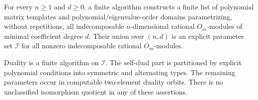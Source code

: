 \begin{theorem}
\label{C:Om-canonical-templates}
For every $n\geq1$ and $d\geq0$, a finite algorithm constructs a finite list
of polynomial matrix templates and polynomial/eigenvalue-order domains
parametrizing, without repetitions, all indecomposable $n$-dimensional
rational $O_m$-modules of minimal coefficient degree $d$. Their union over
$(n,d)$ is an explicit parameter set $\mathscr I$ for all nonzero
indecomposable rational $O_m$-modules.

Duality is a finite algorithm on $\mathscr I$. The self-dual part is
partitioned by explicit polynomial conditions into symmetric and
alternating types. The remaining parameters occur in computable
two-element duality orbits. There is no unclassified isomorphism quotient
in any of these assertions.
\end{theorem}
